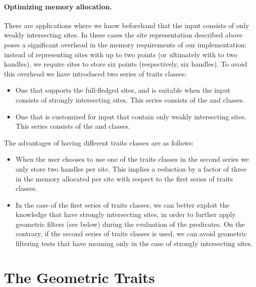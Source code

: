 \paragraph{Optimizing memory allocation.}
There are applications where we know beforehand that the input
consists of only weakly intersecting sites. In these cases the site
representation described above poses a significant overhead in the
memory requirements of our implementation: instead of representing
sites with up to two points (or ultimately with to two handles), we
require sites to store six points (respectively, six handles). To
avoid this overhead we have introduced two series of traits classes:
\begin{itemize}
\item One that supports the full-fledged sites, and is suitable when
  the input consists of strongly intersecting sites. This series
  consists of the 
   and
  classes.
\item One that is customized for input that contain only weakly
  intersecting sites. This series consists of the
   and
  classes.
\end{itemize}
The advantages of having different traits classes are as follows:
\begin{itemize}
\item When the user chooses to use one of the traits classes in the
  second series we only store two handles per site. This implies a
  reduction by a factor of three in the memory allocated per site with
  respect to the first series of traits classes.
\item In the case of the first series of traits classes, we can better
  exploit the knowledge that have strongly intersecting sites, in
  order to further apply geometric filters (see below) during the
  evaluation of the predicates. On the contrary, if the second series
  of traits classes is used, we can avoid geometric filtering tests
  that have meaning only in the case of strongly intersecting sites.
\end{itemize}


\section{The Geometric Traits}
\label{sec:sdg2-traits}

